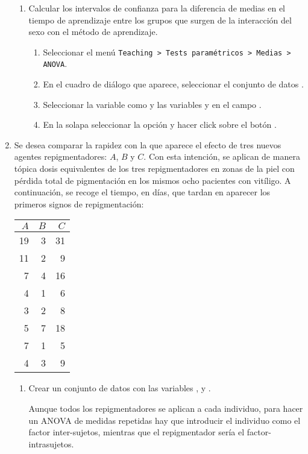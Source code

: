 \begin{enumerate}[leftmargin=*]
\begin{enumerate}
\item Calcular los intervalos de confianza para la diferencia de medias en el tiempo de aprendizaje entre los grupos que
surgen de la interacción del sexo con el método de aprendizaje.
\begin{indicacion}
\begin{enumerate}
\item Seleccionar el menú \texttt{Teaching > Tests paramétricos > Medias > ANOVA}.
\item En el cuadro de diálogo que aparece, seleccionar el conjunto de datos .
\item Seleccionar la variable  como  y las variables
 y  en el campo .
\item En la solapa  seleccionar la opción  y hacer
click sobre el botón .
\end{enumerate}
\end{indicacion}
\end{enumerate}


\item Se desea comparar la rapidez con la que aparece el efecto de tres nuevos agentes repigmentadores: $A$, $B$ y $C$.
Con esta intención, se aplican de manera tópica dosis equivalentes de los tres repigmentadores en zonas de la piel con
pérdida total de pigmentación en los mismos ocho pacientes con vitíligo. A continuación, se recoge el tiempo, en días,
que tardan en aparecer los primeros signos de repigmentación:
\begin{center}
\begin{tabular}{rrr}
\hline
$A$ & $B$ & $C$ \\
\hline
19 & 3 & 31 \\
11 & 2 & 9 \\
7 & 4 & 16 \\
4 & 1 & 6 \\
3 & 2 & 8 \\
5 & 7 & 18 \\
7 & 1 & 5 \\
4 & 3 & 9 \\
\hline
\end{tabular}
\end{center}

\begin{enumerate}
\item Crear un conjunto de datos  con las variables ,  y
.
\begin{indicacion}Aunque todos los repigmentadores se aplican a cada individuo, para hacer un ANOVA de medidas
repetidas hay que introducir el individuo como el factor inter-sujetos, mientras que el repigmentador sería el
factor-intrasujetos.
\end{indicacion}


\end{enumerate}
\end{enumerate}
